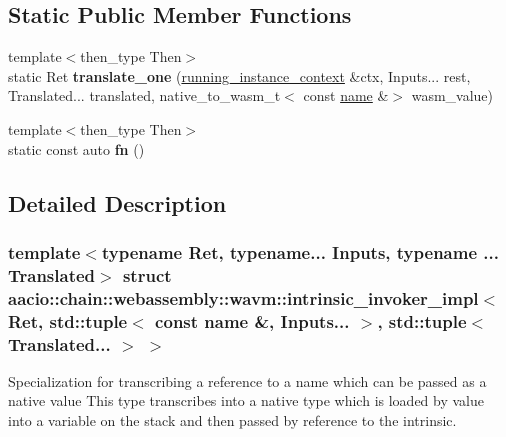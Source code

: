 \subsection*{Static Public Member Functions}
\begin{DoxyCompactItemize}
\item 
\mbox{\label{structaacio_1_1chain_1_1webassembly_1_1wavm_1_1intrinsic__invoker__impl_3_01_ret_00_01std_1_1tupd2828f96960a3f33dc0ab5c4ff6055a9_a4ce6397b96eff0acde2c3b217ec7971f}} 
{\footnotesize template$<$then\+\_\+type Then$>$ }\\static Ret {\bfseries translate\+\_\+one} (\mbox{\hyperlink{structaacio_1_1chain_1_1webassembly_1_1wavm_1_1running__instance__context}{running\+\_\+instance\+\_\+context}} \&ctx, Inputs... rest, Translated... translated, native\+\_\+to\+\_\+wasm\+\_\+t$<$ const \mbox{\hyperlink{structaacio_1_1chain_1_1name}{name}} \&$>$ wasm\+\_\+value)
\item 
\mbox{\label{structaacio_1_1chain_1_1webassembly_1_1wavm_1_1intrinsic__invoker__impl_3_01_ret_00_01std_1_1tupd2828f96960a3f33dc0ab5c4ff6055a9_ac939b24efe517d007edc7bfa77298e42}} 
{\footnotesize template$<$then\+\_\+type Then$>$ }\\static const auto {\bfseries fn} ()
\end{DoxyCompactItemize}


\subsection{Detailed Description}
\subsubsection*{template$<$typename Ret, typename... Inputs, typename ... Translated$>$\newline
struct aacio\+::chain\+::webassembly\+::wavm\+::intrinsic\+\_\+invoker\+\_\+impl$<$ Ret, std\+::tuple$<$ const name \&, Inputs... $>$, std\+::tuple$<$ Translated... $>$ $>$}

Specialization for transcribing a reference to a name which can be passed as a native value This type transcribes into a native type which is loaded by value into a variable on the stack and then passed by reference to the intrinsic.


